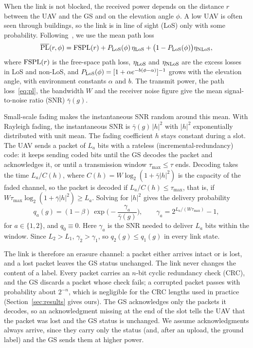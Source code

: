 \documentclass[5p,twocolumn]{elsarticle}
\theoremstyle{remark}
\begin{document}
When the link is not blocked, the received power depends on the distance $r$ between the UAV and the GS and on the elevation angle $\phi$. A low UAV is often seen through buildings, so the link is in line of sight (LoS) only with some probability. Following~\cite{alhourani2014lap}, we use the mean path loss
\begin{equation}\label{eq:pl}
\overline{\rm PL}(r,\phi)={\rm FSPL}(r)+P_{\rm LoS}(\phi)\,\eta_{\rm LoS}+\big(1-P_{\rm LoS}(\phi)\big)\eta_{\rm NLoS},
\end{equation}
where ${\rm FSPL}(r)$ is the free-space path loss, $\eta_{\rm LoS}$ and $\eta_{\rm NLoS}$ are the excess losses in LoS and non-LoS, and $P_{\rm LoS}(\phi)=[1+\alpha e^{-b(\phi-\alpha)}]^{-1}$ grows with the elevation angle, with environment constants $\alpha$ and $b$. The transmit power, the path loss~\eqref{eq:pl}, the bandwidth $W$ and the receiver noise figure give the mean signal-to-noise ratio (SNR) $\bar\gamma(g)$.

Small-scale fading makes the instantaneous SNR random around this mean. With Rayleigh fading, the instantaneous SNR is $\bar\gamma(g)\,|h|^2$ with $|h|^2$ exponentially distributed with unit mean. The fading coefficient $h$ stays constant during a slot. The UAV sends a packet of $L_a$ bits with a rateless (incremental-redundancy) code: it keeps sending coded bits until the GS decodes the packet and acknowledges it, or until a transmission window $\tau_{\max}\le\tau$ ends. Decoding takes the time $L_a/C(h)$, where $C(h)=W\log_2(1+\bar\gamma|h|^2)$ is the capacity of the faded channel, so the packet is decoded if $L_a/C(h)\le\tau_{\max}$, that is, if $W\tau_{\max}\log_2(1+\bar\gamma|h|^2)\ge L_a$. Solving for $|h|^2$ gives the delivery probability
\begin{equation}\label{eq:succ}
q_a(g)=(1-\beta)\,\exp\!\Big(-\frac{\gamma_a}{\bar\gamma(g)}\Big),\qquad \gamma_a=2^{L_a/(W\tau_{\max})}-1,
\end{equation}
for $a\in\{1,2\}$,
and $q_0\equiv0$. Here $\gamma_a$ is the SNR needed to deliver $L_a$ bits within the window. Since $L_2>L_1$, $\gamma_2>\gamma_1$, so $q_2(g)\le q_1(g)$ in every link state.

The link is therefore an erasure channel: a packet either arrives intact or is lost, and a lost packet leaves the GS status unchanged. The link never changes the content of a label. Every packet carries an $n$-bit cyclic redundancy check (CRC), and the GS discards a packet whose check fails; a corrupted packet passes with probability about $2^{-n}$, which is negligible for the CRC lengths used in practice (Section~\ref{sec:results} gives ours). The GS acknowledges only the packets it decodes, so an acknowledgment missing at the end of the slot tells the UAV that the packet was lost and the GS status is unchanged. We assume acknowledgments always arrive, since they carry only the status (and, after an upload, the ground label) and the GS sends them at higher power.
\end{document}
